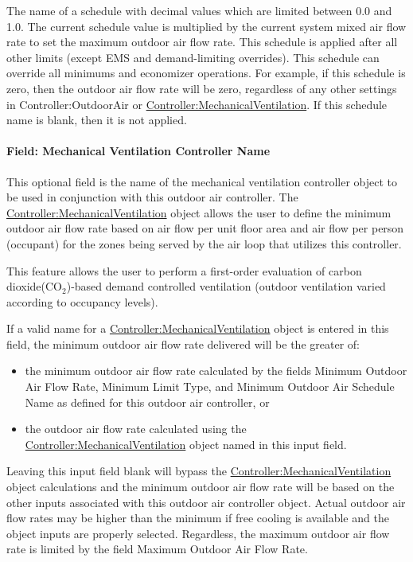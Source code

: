The name of a schedule with decimal values which are limited between 0.0 and 1.0. The current schedule value is multiplied by the current system mixed air flow rate to set the maximum outdoor air flow rate. This schedule is applied after all other limits (except EMS and demand-limiting overrides).  This schedule can override all minimums and economizer operations.  For example, if this schedule is zero, then the outdoor air flow rate will be zero, regardless of any other settings in Controller:OutdoorAir or \hyperref[controllermechanicalventilation]{Controller:MechanicalVentilation}. If this schedule name is blank, then it is not applied.

\paragraph{Field: Mechanical Ventilation Controller Name}\label{field-mechanical-ventilation-controller-name}

This optional field is the name of the mechanical ventilation controller object to be used in conjunction with this outdoor air controller. The \hyperref[controllermechanicalventilation]{Controller:MechanicalVentilation} object allows the user to define the minimum outdoor air flow rate based on air flow per unit floor area and air flow per person (occupant) for the zones being served by the air loop that utilizes this controller.

This feature allows the user to perform a first-order evaluation of carbon dioxide(CO\(_{2}\))-based demand controlled ventilation (outdoor ventilation varied according to occupancy levels).

If a valid name for a \hyperref[controllermechanicalventilation]{Controller:MechanicalVentilation} object is entered in this field, the minimum outdoor air flow rate delivered will be the greater of:

\begin{itemize}
\item
  the minimum outdoor air flow rate calculated by the fields Minimum Outdoor Air Flow Rate, Minimum Limit Type, and Minimum Outdoor Air Schedule Name as defined for this outdoor air controller, or
\item
  the outdoor air flow rate calculated using the \hyperref[controllermechanicalventilation]{Controller:MechanicalVentilation} object named in this input field.
\end{itemize}

Leaving this input field blank will bypass the \hyperref[controllermechanicalventilation]{Controller:MechanicalVentilation} object calculations and the minimum outdoor air flow rate will be based on the other inputs associated with this outdoor air controller object. Actual outdoor air flow rates may be higher than the minimum if free cooling is available and the object inputs are properly selected. Regardless, the maximum outdoor air flow rate is limited by the field Maximum Outdoor Air Flow Rate.

